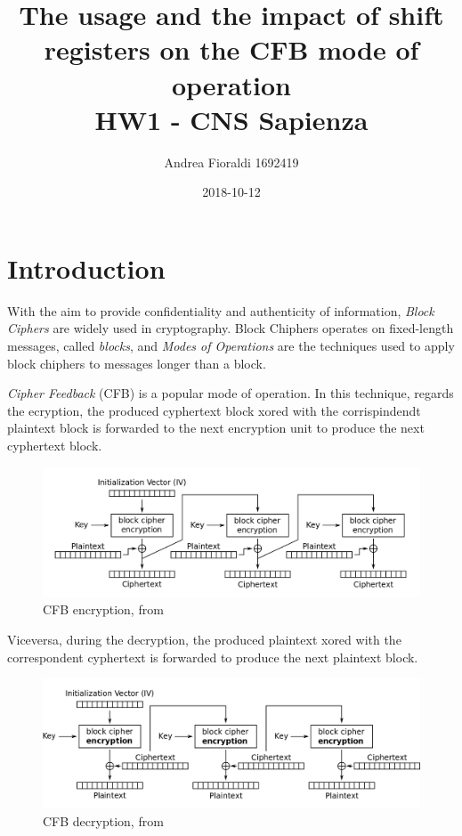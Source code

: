 \documentclass[11pt]{article}
\title{{\bf The usage and the impact of shift registers on the CFB mode of operation} \\ \bigskip \large HW1 - CNS Sapienza}
\date{2018-10-12}
\author{Andrea Fioraldi 1692419}
\begin{document}
\maketitle

\section{Introduction}

With the aim to provide confidentiality and authenticity of information, {\em Block Ciphers} are widely used in cryptography. Block Chiphers operates on fixed-length messages, called {\em blocks}, and {\em Modes of Operations} are the techniques used to apply block chiphers to messages longer than a block.

{\em Cipher Feedback} (CFB) is a popular mode of operation. In this technique, regards the ecryption, the produced cyphertext block xored with the corrispindendt plaintext block is forwarded to the next encryption unit to produce the next cyphertext block. 

\begin{figure}[!ht]
  \centering
  \includegraphics[width=1\textwidth]{pic1-hw1-1692419}
  \caption{CFB encryption, from \cite{wiki}}
  \label{fig:cfb_enc}
\end{figure}

Viceversa, during the decryption, the produced plaintext xored with the correspondent cyphertext is forwarded to produce the next plaintext block.

\begin{figure}[!ht]
  \centering
  \includegraphics[width=1\textwidth]{pic2-hw1-1692419}
  \caption{CFB decryption, from \cite{wiki}}
  \label{fig:cfb_dec}
\end{figure}
\end{document}
